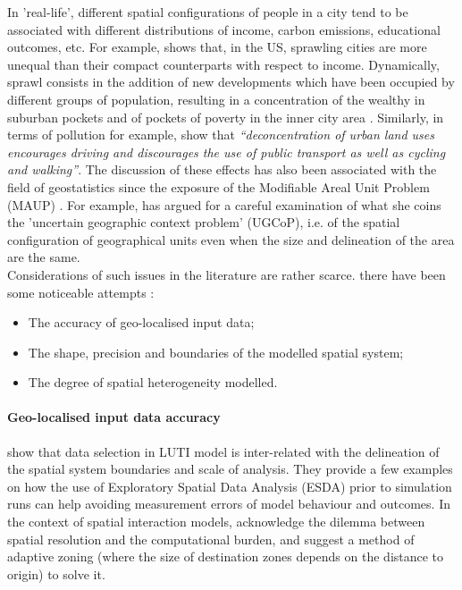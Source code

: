 \documentclass[preprint,5p,times,twocolumn,authoryear]{elsarticle}
\begin{document}
In 'real-life', different spatial configurations of people in a city tend to be associated with different distributions of income, carbon emissions, educational outcomes, etc. For example, \citet{wheeler2006urban} shows that, in the US, sprawling cities are more unequal than their compact counterparts with respect to income. Dynamically, sprawl  consists in the addition of new developments which have been occupied by different groups of population, resulting in a concentration of the wealthy in suburban pockets and of pockets of poverty in the inner city area \citep{jargowsky2002sprawl}. Similarly, in terms of pollution for example, \citet[p.173]{schwanen2001travel} show that \textit{``deconcentration of urban land uses encourages driving and discourages the use of public transport as well as cycling and walking''}. The discussion of these effects has also been associated with the field of geostatistics since the exposure of the Modifiable Areal Unit Problem (MAUP) \citep{Openshaw1984, FotheringhamWong1991}. For example, \citet{Kwan2012} has argued for a careful examination of what she coins the 'uncertain geographic context problem' (UGCoP), i.e. of the spatial configuration of geographical units even when the size and delineation of the area are the same.\\

Considerations of such issues in the  literature are rather scarce.  there have been some noticeable attempts :
\begin{itemize}
\item The accuracy of geo-localised input data;
\item The shape, precision and boundaries of the modelled spatial system;
\item The degree of spatial heterogeneity modelled.
\end{itemize}

\paragraph{Geo-localised input data accuracy} \citet{Thomasetal2017} show that data selection in LUTI model is inter-related with the delineation of the spatial system boundaries and  scale of analysis. They provide a few examples on how the use of Exploratory Spatial Data Analysis (ESDA) prior to simulation runs can help avoiding measurement errors of model behaviour and outcomes. In the context of spatial interaction models, \citet{hagen2012new} acknowledge the dilemma between spatial resolution and the computational burden, and suggest a method of adaptive zoning (where the size of destination zones depends on the distance to origin) to solve it.
\end{document}
